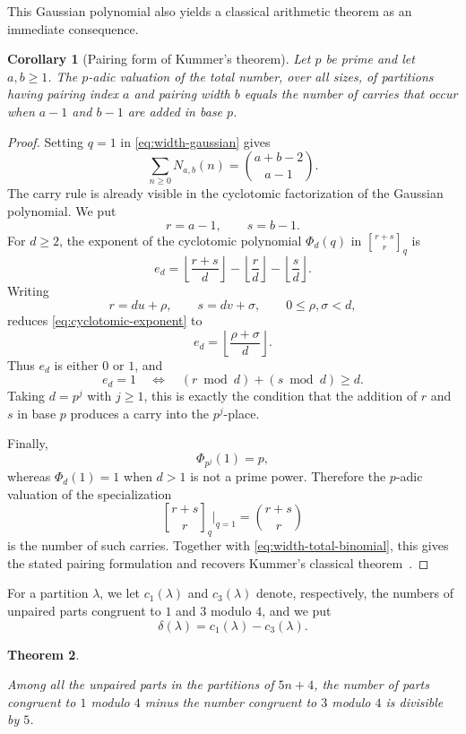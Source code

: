 \documentclass[11pt]{article}
\newtheorem{theorem}{Theorem}[section]
\newtheorem{corollary}[theorem]{Corollary}
\theoremstyle{definition}
\theoremstyle{remark}
\newcommand{\qbinom}[3][]{%
  \genfrac{[}{]}{0pt}{}{#2}{#3}_{#1}%
}
\begin{document}
This Gaussian polynomial also yields a classical arithmetic theorem as an
immediate consequence.

\begin{corollary}[Pairing form of Kummer's theorem]\label{cor:kummer}
Let $p$ be prime and let $a,b\geq1$.  The $p$-adic valuation of the total
number, over all sizes, of partitions having pairing index $a$ and pairing
width $b$ equals the number of carries that occur when $a-1$ and $b-1$
are added in base $p$.
\end{corollary}

\begin{proof}
Setting $q=1$ in \eqref{eq:width-gaussian} gives
\begin{equation}\label{eq:width-total-binomial}
 \sum_{n\geq0}N_{a,b}(n)
 =\binom{a+b-2}{a-1}.
\end{equation}
The carry rule is already visible in the cyclotomic factorization of the Gaussian
polynomial.  We put
\[
 r=a-1,\qquad s=b-1.
\]
For $d\geq2$, the exponent of the cyclotomic polynomial $\Phi_d(q)$ in
$\qbinom[q]{r+s}{r}$ is
\begin{equation}\label{eq:cyclotomic-exponent}
 e_d=\left\lfloor\frac{r+s}{d}\right\rfloor
     -\left\lfloor\frac r d\right\rfloor
     -\left\lfloor\frac s d\right\rfloor.
\end{equation}
Writing
\[
 r=du+\rho,\qquad s=dv+\sigma,
 \qquad0\leq\rho,\sigma<d,
\]
reduces \eqref{eq:cyclotomic-exponent} to
\[
 e_d=\left\lfloor\frac{\rho+\sigma}{d}\right\rfloor.
\]
Thus $e_d$ is either $0$ or $1$, and
\[
 e_d=1
 \quad\Longleftrightarrow\quad
 (r\bmod d)+(s\bmod d)\geq d.
\]
Taking $d=p^j$ with $j\geq1$, this is exactly the condition that the addition of $r$ and
$s$ in base $p$ produces a carry into the $p^j$-place.

Finally,
\[
 \Phi_{p^j}(1)=p,
\]
whereas $\Phi_d(1)=1$ when $d>1$ is not a prime power.  Therefore the
$p$-adic valuation of the specialization
\[
 \qbinom[q]{r+s}{r}\Big|_{q=1}=\binom{r+s}{r}
\]
is the number of such carries.  Together with
\eqref{eq:width-total-binomial}, this gives the stated pairing formulation and
recovers Kummer's classical theorem~\cite{Kummer1852}.
\end{proof}


For a partition $\lambda$, we let $c_1(\lambda)$ and $c_3(\lambda)$ denote,
respectively, the numbers of unpaired parts congruent to $1$ and $3$ modulo
$4$, and we put
\[
 \delta(\lambda)=c_1(\lambda)-c_3(\lambda).
\]

\begin{theorem}\label{thm:unpaired-mod5}

Among all the unpaired parts in the partitions of $5n+4$, the
number of parts congruent to $1$ modulo $4$ minus the number congruent to $3$
modulo $4$ is divisible by $5$.
\end{theorem}
\end{document}
